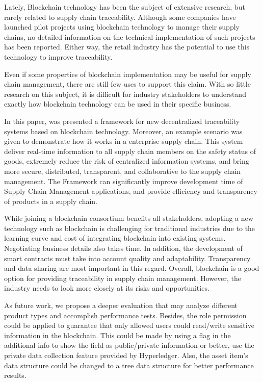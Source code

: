 \acresetall 
\label{chap:conclusion}

Lately, Blockchain technology has been the subject of extensive research, but rarely related to supply chain traceability. Although some companies have launched pilot projects using blockchain technology to manage their supply chains, no detailed information on the technical implementation of such projects has been reported. Either way, the retail industry has the potential to use this technology to improve traceability.

Even if some properties of blockchain implementation may be useful for supply chain management, there are still few uses to support this claim. With so little research on this subject, it is difficult for industry stakeholders to understand exactly how blockchain technology can be used in their specific business.

In this paper, was presented a framework for new decentralized traceability systems based on blockchain technology. Moreover, an example scenario was given to demonstrate how it works in a enterprise supply chain. This system deliver real-time information to all supply chain members on the safety status of goods, extremely reduce the risk of centralized information systems, and bring more secure, distributed, transparent, and collaborative to the supply chain management. The Framework can significantly improve development time of Supply Chain Management applications, and provide efficiency and transparency of products in a supply chain.

While joining a blockchain consortium benefits all stakeholders, adopting a new technology such as blockchain is challenging for traditional industries due to the learning curve and cost of integrating blockchain into existing systems. Negotiating business details also takes time. In addition, the development of smart contracts must take into account quality and adaptability. Transparency and data sharing are most important in this regard. Overall, blockchain is a good option for providing traceability in supply chain management. However, the industry needs to look more closely at its risks and opportunities.

As future work, we propose a deeper evaluation that may analyze different product types and accomplish performance tests. Besides, the role permission could be applied to guarantee that only allowed users could read/write sensitive information in the blockchain. This could be made by using a flag in the additional info to show the field as public/private information or better, use the private data collection feature provided by Hyperledger. Also, the asset item's data structure could be changed to a tree data structure for better performance results. 